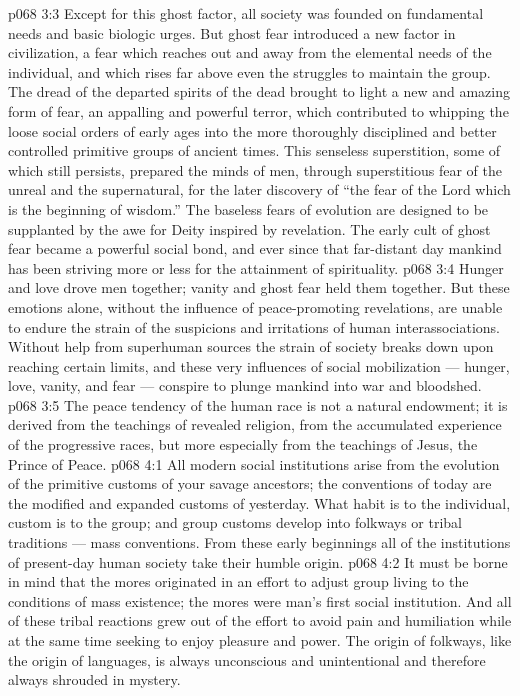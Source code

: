\vs p068 3:3 Except for this ghost factor, all society was founded on fundamental needs and basic biologic urges. But ghost fear introduced a new factor in civilization, a fear which reaches out and away from the elemental needs of the individual, and which rises far above even the struggles to maintain the group. The dread of the departed spirits of the dead brought to light a new and amazing form of fear, an appalling and powerful terror, which contributed to whipping the loose social orders of early ages into the more thoroughly disciplined and better controlled primitive groups of ancient times. This senseless superstition, some of which still persists, prepared the minds of men, through superstitious fear of the unreal and the supernatural, for the later discovery of “the fear of the Lord which is the beginning of wisdom.” The baseless fears of evolution are designed to be supplanted by the awe for Deity inspired by revelation. The early cult of ghost fear became a powerful social bond, and ever since that far\hyp{}distant day mankind has been striving more or less for the attainment of spirituality.
\vs p068 3:4 \pc Hunger and love drove men together; vanity and ghost fear held them together. But these emotions alone, without the influence of peace\hyp{}promoting revelations, are unable to endure the strain of the suspicions and irritations of human interassociations. Without help from superhuman sources the strain of society breaks down upon reaching certain limits, and these very influences of social mobilization --- hunger, love, vanity, and fear --- conspire to plunge mankind into war and bloodshed.
\vs p068 3:5 The peace tendency of the human race is not a natural endowment; it is derived from the teachings of revealed religion, from the accumulated experience of the progressive races, but more especially from the teachings of Jesus, the Prince of Peace.
\vs p068 4:1 All modern social institutions arise from the evolution of the primitive customs of your savage ancestors; the conventions of today are the modified and expanded customs of yesterday. What habit is to the individual, custom is to the group; and group customs develop into folkways or tribal traditions --- mass conventions. From these early beginnings all of the institutions of present\hyp{}day human society take their humble origin.
\vs p068 4:2 It must be borne in mind that the mores originated in an effort to adjust group living to the conditions of mass existence; the mores were man’s first social institution. And all of these tribal reactions grew out of the effort to avoid pain and humiliation while at the same time seeking to enjoy pleasure and power. The origin of folkways, like the origin of languages, is always unconscious and unintentional and therefore always shrouded in mystery.
